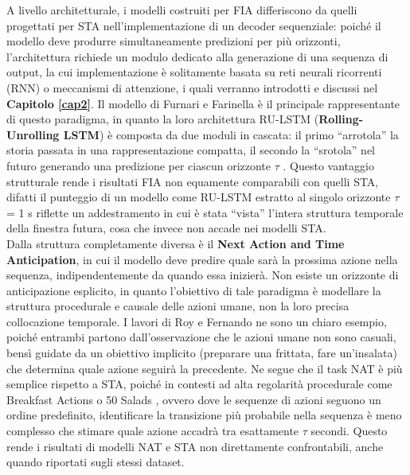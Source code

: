 A livello architetturale, i modelli costruiti per FIA differiscono da quelli progettati per STA nell'implementazione di un decoder sequenziale: poiché il modello deve produrre simultaneamente predizioni per più orizzonti, l'architettura richiede un modulo dedicato alla generazione di una sequenza di output, la cui implementazione è solitamente basata su reti neurali ricorrenti (RNN) o meccanismi di attenzione, i quali verranno introdotti e discussi nel \textbf{Capitolo \ref{cap2}}. Il modello di Furnari e Farinella \cite{furnari2019would,furnari2020rolling} è il principale rappresentante di questo paradigma, in quanto la loro architettura RU-LSTM (\textbf{Rolling-Unrolling LSTM}) è composta da due moduli in cascata: il primo ``arrotola'' la storia passata in una rappresentazione compatta, il secondo la ``srotola'' nel futuro generando una predizione per ciascun orizzonte $\tau$ \cite{furnari2020rolling}. Questo vantaggio strutturale rende i risultati FIA non equamente comparabili con quelli STA, difatti il punteggio di un modello come RU-LSTM estratto al singolo orizzonte $\tau$ = 1 s riflette un addestramento in cui è stata ``vista'' l'intera struttura temporale della finestra futura, cosa che invece non accade nei modelli STA. \\
Dalla struttura completamente diversa è il \textbf{Next Action and Time Anticipation}, in cui il modello deve predire quale sarà la prossima azione nella sequenza, indipendentemente da quando essa inizierà. Non esiste un orizzonte di anticipazione esplicito, in quanto l'obiettivo di tale paradigma è modellare la struttura procedurale e causale delle azioni umane, non la loro precisa collocazione temporale. I lavori di Roy e Fernando \cite{roy2022action, roy2024predicting} ne sono un chiaro esempio, poiché entrambi partono dall'osservazione che le azioni umane non sono casuali, bensì guidate da un obiettivo implicito (preparare una frittata, fare un'insalata) che determina quale azione seguirà la precedente. Ne segue che il task NAT è più semplice rispetto a STA, poiché in contesti ad alta regolarità procedurale come Breakfast Actions \cite{kuehne2014language} o 50 Salads \cite{stein2013salads}, ovvero dove le sequenze di azioni seguono un ordine predefinito, identificare la transizione più probabile nella sequenza è meno complesso che stimare quale azione accadrà tra esattamente $\tau$ secondi. Questo rende i risultati di modelli NAT e STA non direttamente confrontabili, anche quando riportati sugli stessi dataset.

